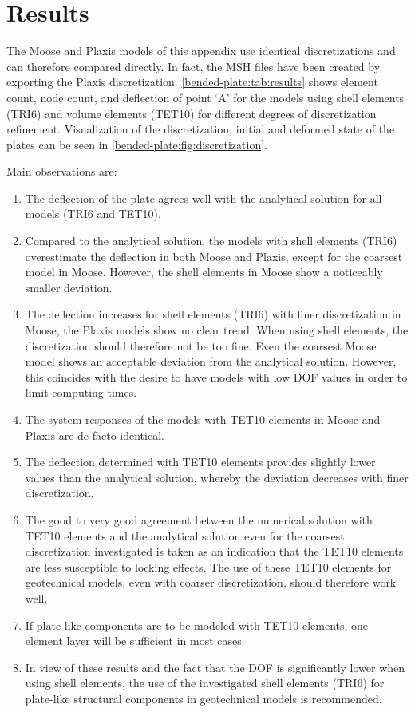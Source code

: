 \section{Results}
\label{bended-plate:sec:results}

The Moose and Plaxis models of this appendix use identical discretizations and
can therefore compared directly. In fact, the MSH files have been created by
exporting the Plaxis discretization. \autoref{bended-plate:tab:results} shows
element count, node count, and deflection of point ‘A’ for the models using
shell elements (TRI6) and volume elements (TET10) for different degrees of
discretization refinement. Visualization of the discretization, initial and
deformed state of the plates can be seen in
\autoref{bended-plate:fig:discretization}.

Main observations are:

\begin{enumerate}
    \item The deflection of the plate agrees well with the analytical solution for all
          models (TRI6 and TET10).
    \item Compared to the analytical solution, the models with shell elements (TRI6)
          overestimate the deflection in both Moose and Plaxis, except for the coarsest
          model in Moose. However, the shell elements in Moose show a noticeably smaller
          deviation.
    \item The deflection increases for shell elements (TRI6) with finer discretization in
          Moose, the Plaxis models show no clear trend. When using shell elements, the
          discretization should therefore not be too fine. Even the coarsest Moose model
          shows an acceptable deviation from the analytical solution. However, this
          coincides with the desire to have models with low DOF values in order to limit
          computing times.
    \item The system responses of the models with TET10 elements in Moose and Plaxis are
          de-facto identical.
    \item The deflection determined with TET10 elements provides slightly lower values
          than the analytical solution, whereby the deviation decreases with finer
          discretization.
    \item The good to very good agreement between the numerical solution with TET10
          elements and the analytical solution even for the coarsest discretization
          investigated is taken as an indication that the TET10 elements are less
          susceptible to locking effects. The use of these TET10 elements for
          geotechnical models, even with coarser discretization, should therefore work
          well.
    \item If plate-like components are to be modeled with TET10 elements, one element
          layer will be sufficient in most cases.
    \item In view of these results and the fact that the DOF is significantly lower when
          using shell elements, the use of the investigated shell elements (TRI6) for
          plate-like structural components in geotechnical models is recommended.
\end{enumerate}

